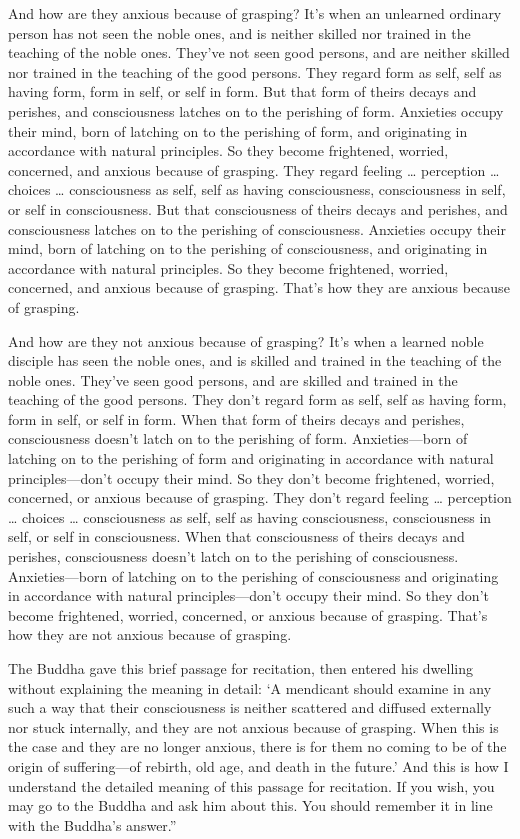 \documentclass[12pt,openany]{book}%
\begin{document}
And how are they anxious because of grasping? It’s when an unlearned ordinary person has not seen the noble ones, and is neither skilled nor trained in the teaching of the noble ones. They’ve not seen good persons, and are neither skilled nor trained in the teaching of the good persons. They regard form as self, self as having form, form in self, or self in form. But that form of theirs decays and perishes, and consciousness latches on to the perishing of form. Anxieties occupy their mind, born of latching on to the perishing of form, and originating in accordance with natural principles. So they become frightened, worried, concerned, and anxious because of grasping. They regard feeling … perception … choices … consciousness as self, self as having consciousness, consciousness in self, or self in consciousness. But that consciousness of theirs decays and perishes, and consciousness latches on to the perishing of consciousness. Anxieties occupy their mind, born of latching on to the perishing of consciousness, and originating in accordance with natural principles. So they become frightened, worried, concerned, and anxious because of grasping. That’s how they are anxious because of grasping. 

And how are they not anxious because of grasping? It’s when a learned noble disciple has seen the noble ones, and is skilled and trained in the teaching of the noble ones. They’ve seen good persons, and are skilled and trained in the teaching of the good persons. They don’t regard form as self, self as having form, form in self, or self in form. When that form of theirs decays and perishes, consciousness doesn’t latch on to the perishing of form. Anxieties—born of latching on to the perishing of form and originating in accordance with natural principles—don’t occupy their mind. So they don’t become frightened, worried, concerned, or anxious because of grasping. They don’t regard feeling … perception … choices … consciousness as self, self as having consciousness, consciousness in self, or self in consciousness. When that consciousness of theirs decays and perishes, consciousness doesn’t latch on to the perishing of consciousness. Anxieties—born of latching on to the perishing of consciousness and originating in accordance with natural principles—don’t occupy their mind. So they don’t become frightened, worried, concerned, or anxious because of grasping. That’s how they are not anxious because of grasping. 

The Buddha gave this brief passage for recitation, then entered his dwelling without explaining the meaning in detail: ‘A mendicant should examine in any such a way that their consciousness is neither scattered and diffused externally nor stuck internally, and they are not anxious because of grasping. When this is the case and they are no longer anxious, there is for them no coming to be of the origin of suffering—of rebirth, old age, and death in the future.’ And this is how I understand the detailed meaning of this passage for recitation. If you wish, you may go to the Buddha and ask him about this. You should remember it in line with the Buddha’s answer.” 
\end{document}
